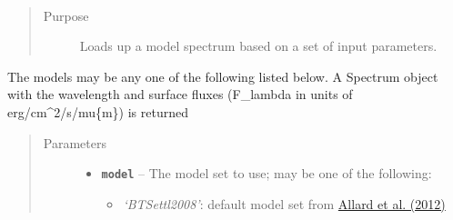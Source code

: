 \documentclass[letterpaper,10pt,english]{sphinxmanual}
\begin{document}
\begin{fulllineitems}
\label{splat_model:splat_model.loadModel}~\begin{quote}\begin{description}
\item[{Purpose}] \leavevmode
Loads up a model spectrum based on a set of input parameters.

\end{description}\end{quote}

The models may be any one of the following listed below.
A Spectrum object with the wavelength and surface fluxes (F\_lambda in units of erg/cm\textasciicircum{}2/s/mu\{m\}) is returned
\begin{quote}\begin{description}
\item[{Parameters}] \leavevmode\begin{itemize}
\item {} 
\textbf{\texttt{model}} -- 
The model set to use; may be one of the following:
\begin{itemize}
\item {} 
\emph{`BTSettl2008'}: default model set from \href{http://adsabs.harvard.edu/abs/2012RSPTA.370.2765A}{Allard et al. (2012)}

\end{itemize}


\end{itemize}
\end{description}
\end{quote}
\end{fulllineitems}
\end{document}
